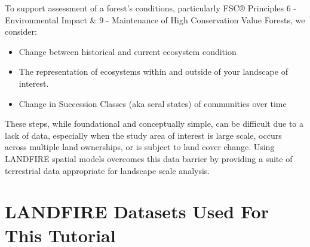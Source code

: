 \documentclass[
]{book}
\providecommand{\tightlist}{%
  \setlength{\itemsep}{0pt}\setlength{\parskip}{0pt}}
\begin{document}
To support assessment of a forest's conditions, particularly FSC® Principles 6 - Environmental Impact \& 9 - Maintenance of High Conservation Value Forests, we consider:

\begin{itemize}
\tightlist
\item
  Change between historical and current ecosystem condition
\item
  The representation of ecosystems within and outside of your landscape of interest.
\item
  Change in Succession Classes (aka seral states) of communities over time
\end{itemize}

These steps, while foundational and conceptually simple, can be difficult due to a lack of data, especially when the study area of interest is large scale, occurs across multiple land ownerships, or is subject to land cover change. Using LANDFIRE spatial models overcomes this data barrier by providing a suite of terrestrial data appropriate for landscape scale analysis.

\hypertarget{landfire-datasets-used-for-this-tutorial}{%
\section{LANDFIRE Datasets Used For This Tutorial}\label{landfire-datasets-used-for-this-tutorial}}
\end{document}
